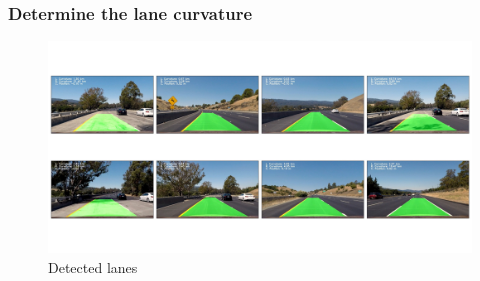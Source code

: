\documentclass[12pt,a4paper,onecolumn]{report}
\begin{document}
\subsubsection*{Determine the lane curvature}
\begin{figure}[H]
\centering
\includegraphics[width=\textwidth]{output_images/grid_images/grid_lane_image.jpg}
\caption{Detected lanes}
\end{figure}
\end{document}

